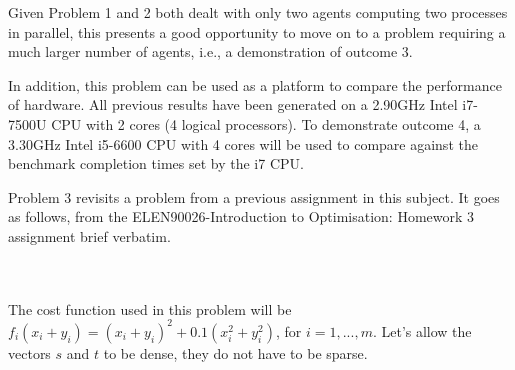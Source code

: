 \documentclass[12pt]{article}
\begin{document}
Given Problem 1 and 2 both dealt with only two agents computing two processes in parallel, this presents a good opportunity to move on to a problem requiring a much larger number of agents, i.e., a demonstration of outcome 3.

In addition, this problem can be used as a platform to compare the performance of hardware. All previous results have been generated on a 2.90GHz Intel i7-7500U CPU with 2 cores (4 logical processors). To demonstrate outcome 4, a 3.30GHz Intel i5-6600 CPU with 4 cores will be used to compare against the benchmark completion times set by the i7 CPU.

Problem 3 revisits a problem from a previous assignment in this subject. It goes as follows, from the ELEN90026-Introduction to Optimisation: Homework 3 assignment brief verbatim.

\noindent{}\\\\

The cost function used in this problem will be $f_i(x_i+y_i)=(x_i+y_i)^2+0.1(x_i^2+y_i^2)$, for $i=1,...,m$. Let's allow the vectors $s$ and $t$ to be dense, they do not have to be sparse.
\end{document}
